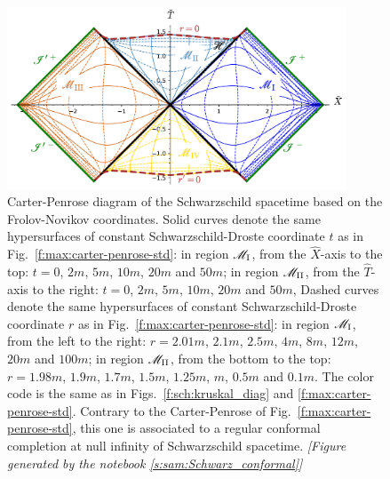 \begin{figure}
\centerline{\includegraphics[width=0.9\textwidth]{max_carter-penrose-FN.pdf}}
\caption[]{\label{f:max:carter-penrose-FN} \footnotesize
Carter-Penrose diagram of the Schwarzschild spacetime based on the Frolov-Novikov coordinates.
Solid curves denote the same hypersurfaces of constant Schwarzschild-Droste coordinate
$t$ as in Fig.~\ref{f:max:carter-penrose-std}: in region $\mathscr{M}_{\rm I}$, from the $\hat{X}$-axis to the top: $t=0$, $2m$,
$5m$, $10m$, $20m$ and $50m$;
in region $\mathscr{M}_{\rm II}$, from the $\hat{T}$-axis
to the right: $t=0$, $2m$, $5m$, $10m$, $20m$ and $50m$,
Dashed curves denote the same hypersurfaces of constant Schwarzschild-Droste coordinate
$r$ as in Fig.~\ref{f:max:carter-penrose-std}: in region $\mathscr{M}_{\rm I}$, from the left to the right: $r=2.01m$, $2.1m$, $2.5m$, $4m$, $8m$, $12m$, $20m$ and $100m$;
in region $\mathscr{M}_{\rm II}$, from the bottom to the top: $r=1.98m$, $1.9m$, $1.7m$,
$1.5m$, $1.25m$, $m$, $0.5m$ and $0.1m$.
The color code is the same as in Figs.~\ref{f:sch:kruskal_diag} and \ref{f:max:carter-penrose-std}.
Contrary to the Carter-Penrose of Fig.~\ref{f:max:carter-penrose-std}, this one is
associated to a regular conformal completion at null infinity of Schwarzschild spacetime.
\textsl{[Figure generated by the notebook \ref{s:sam:Schwarz_conformal}]}
}
\end{figure}



